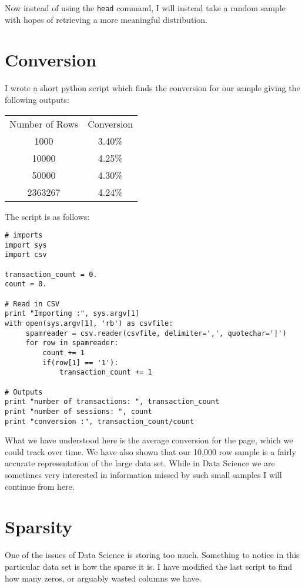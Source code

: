 \documentclass[a4paper]{report}
\begin{document}
Now instead of using the \texttt{head} command, I will instead take a random sample with hopes of retrieving a more meaningful distribution.

\section{Conversion}
I wrote a short python script which finds the conversion for our sample giving the following outputs:

\begin{center}
\begin{tabular}{ c c }
 Number of Rows & Conversion \\ 
 1000 & 3.40\% \\ 
 10000 & 4.25\% \\ 
 50000 & 4.30\% \\ 
 2363267 & 4.24\% \\ 
\end{tabular}
\end{center}

\newpage
The script is as follows:
\begin{lstlisting}
# imports
import sys
import csv

transaction_count = 0.
count = 0.

# Read in CSV
print "Importing :", sys.argv[1]
with open(sys.argv[1], 'rb') as csvfile:
     spamreader = csv.reader(csvfile, delimiter=',', quotechar='|')
     for row in spamreader:
         count += 1
         if(row[1] == '1'):
             transaction_count += 1

# Outputs
print "number of transactions: ", transaction_count
print "number of sessions: ", count
print "conversion :", transaction_count/count
\end{lstlisting}

What we have understood here is the average conversion for the page, which we could track over time. We have also shown that our 10,000 row sample is a fairly accurate representation of the large data set. While in Data Science we are sometimes very interested in information missed by such small samples I will continue from here. 

\section{Sparsity}
One of the issues of Data Science is storing too much. Something to notice in this particular data set is how the sparse it is. I have modified the last script to find how many zeros, or arguably wasted columns we have.
\end{document}
